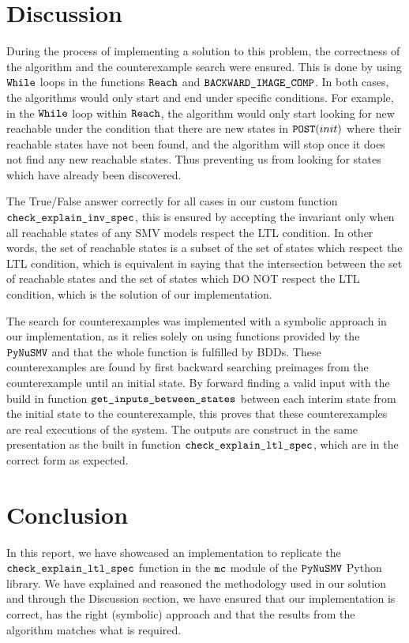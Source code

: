 \documentclass{article}
\begin{document}
\section{Discussion}

During the process of implementing a solution to this problem, the correctness of the algorithm and the counterexample search were ensured. This is done by using $\verb|While|$ loops in the functions $\verb|Reach|$ and $\verb|BACKWARD_IMAGE_COMP|$. In both cases, the algorithms would only start and end under specific conditions. For example, in the $\verb|While|$ loop within $\verb|Reach|$, the algorithm would only start looking for new reachable under the condition that there are new states in $\verb|POST|(init)$ where their reachable states have not been found, and the algorithm will stop once it does not find any new reachable states. Thus preventing us from looking for states which have already been discovered.

\medskip

The True/False answer correctly for all cases in our custom function $\verb|check_explain_inv_spec|$, this is ensured by accepting the invariant only when all reachable states of any SMV models respect the LTL condition. In other words, the set of reachable states is a subset of the set of states which respect the LTL condition, which is equivalent in saying that the intersection between the set of reachable states and the set of states which DO NOT respect the LTL condition, which is the solution of our implementation.

\medskip

The search for counterexamples was implemented with a symbolic approach in our implementation, as it relies solely on using functions provided by the $\verb|PyNuSMV|$ and that the whole function is fulfilled by BDDs. These counterexamples are found by first backward searching preimages from the counterexample until an initial state. By forward finding a valid input with the build in function $\verb|get_inputs_between_states|$ between each interim state from the initial state to the counterexample, this proves that these counterexamples are real executions of the system. The outputs are construct in the same presentation as the built in function $\verb|check_explain_ltl_spec|$, which are in the correct form as expected.

\section{Conclusion}

In this report, we have showcased an implementation to replicate the $\verb|check_explain_ltl_spec|$ function in the $\verb|mc|$ module of the $\verb|PyNuSMV|$ Python library. We have explained and reasoned the methodology used in our solution and through the Discussion section, we have ensured that our implementation is correct, has the right (symbolic) approach and that the results from the algorithm matches what is required.

\nocite{lvl-2013-707009}
\nocite{alur_2015}
\nocite{nusmv}
\nocite{pynusmv}



\end{document}
